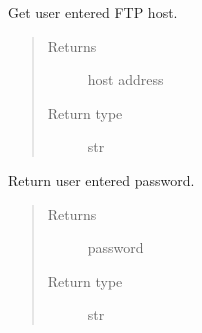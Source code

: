 \documentclass[letterpaper,10pt,english]{sphinxmanual}
\begin{document}
\begin{fulllineitems}
\begin{fulllineitems}
\end{fulllineitems}


\begin{fulllineitems}
\label{\detokenize{polo.windows:polo.windows.ftp_dialog.FTPDialog.host}}
Get user entered FTP host.
\begin{quote}\begin{description}
\item[{Returns}] \leavevmode
host address

\item[{Return type}] \leavevmode
str

\end{description}\end{quote}

\end{fulllineitems}


\begin{fulllineitems}
\label{\detokenize{polo.windows:polo.windows.ftp_dialog.FTPDialog.password}}
Return user entered password.
\begin{quote}\begin{description}
\item[{Returns}] \leavevmode
password

\item[{Return type}] \leavevmode
str

\end{description}\end{quote}

\end{fulllineitems}



\end{fulllineitems}
\end{document}
